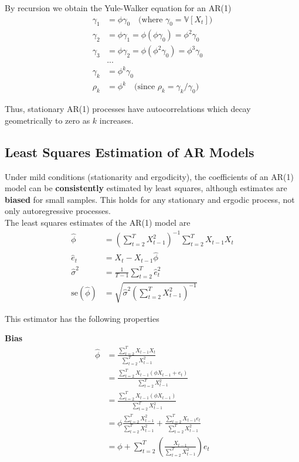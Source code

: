 \documentclass[latex/main.tex]{subfiles}
\begin{document}
By recursion we obtain the Yule-Walker equation for an AR(1)
\begin{align*}
    \gamma_1 &= \phi \gamma_0 \quad \text{(where $\gamma_0 = \mathbb{V}[X_t]$)}\\
    \gamma_2 &= \phi\gamma_1 = \phi(\phi\gamma_0) = \phi^2\gamma_0\\
    \gamma_3 &= \phi\gamma_2 = \phi(\phi^2\gamma_0) = \phi^3\gamma_0\\
    &...\\
    \gamma_k &= \phi^k\gamma_0\\
    \rho_k &= \phi^k \quad \text{(since $\rho_k = \gamma_k / \gamma_0$)}
\end{align*}

Thus, stationary AR(1) processes have autocorrelations which decay geometrically to zero as $k$ increases.

\subsection{Least Squares Estimation of AR Models}

Under mild conditions (stationarity and ergodicity), the coefficients of an AR(1) model can be \textbf{consistently} estimated by least squares, although estimates are \textbf{biased} for small samples. This holds for any stationary and ergodic process, not only autoregressive processes.\\

The least squares estimates of the AR(1) model are
\begin{align}
    \hat \phi &= (\sum_{t=2}^T X_{t-1}^2)^{-1} \sum_{t=2}^T X_{t-1} X_t \label{eq:phi-hat}\\
    \hat e_t &= X_t - X_{t-1} \hat \phi \label{eq:e-hat}\\
    \hat \sigma^2 &= \frac{1}{T-1} \sum_{t=2}^T \hat e_t^2 \label{eq:var-hat}\\
    \text{se}(\hat \phi) &= \sqrt{\hat \sigma^2 (\sum_{t=2}^T X_{t-1}^2)^{-1}} \label{eq:se-hat}
\end{align}

This estimator has the following properties

\textbf{Bias}\\

\begin{align*}
    \hat \phi &= \frac{\sum_{t=2}^T X_{t-1} X_t}{\sum_{t=2}^T X_{t-1}^2}\\
    &= \frac{\sum_{t=2}^T X_{t-1} (\phi X_{t-1} + e_t)}{\sum_{t=2}^T X_{t-1}^2}\\
    &= \frac{\sum_{t=2}^T X_{t-1}(\phi X_{t-1})}{\sum_{t=2}^T X_{t-1}^2}\\
    &= \phi \frac{\sum_{t=2}^T X_{t-1}^2}{\sum_{t=2}^T X_{t-1}^2} + \frac{\sum_{t=2}^T X_{t-1} e_t}{\sum_{t=2}^T X_{t-1}^2}\\
    &= \phi + \sum_{t=2}^T (\frac{X_{t-1}}{\sum_{t=2}^T X_{t-1}^2}) e_t
\end{align*}
\end{document}
